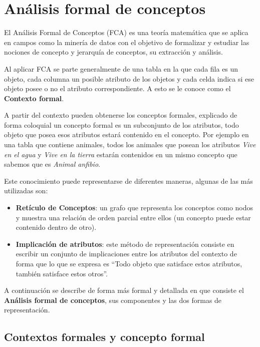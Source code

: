 
\chapter*{Análisis formal de conceptos}

	
	El Análisis Formal de Conceptos (FCA) es una teoría matemática que se aplica en campos como la minería de datos con el objetivo de formalizar y estudiar las nociones de concepto y jerarquía de conceptos, su extracción y análisis.
	
	Al aplicar FCA se parte generalmente de una tabla en la que cada fila es un objeto, cada columna un posible atributo de los objetos y cada celda indica si ese objeto posee o no el atributo correspondiente. A esto se le conoce como el \textbf{Contexto formal}.
	
	A partir del contexto pueden obtenerse los conceptos formales, explicado de forma coloquial un concepto formal es un subconjunto de los atributos, todo objeto que posea esos atributos estará contenido en el concepto. Por ejemplo en una tabla que contiene animales, todos los animales que posean los atributos \textit{Vive en el agua} y \textit{Vive en la tierra} estarán contenidos en un mismo concepto que sabemos que es \textit{Animal anfibio}.
	
	Este conocimiento puede representarse de diferentes maneras, algunas de las más utilizadas son:
	
	\begin{itemize}
		\item  \textbf{Retículo de Conceptos}: un grafo que representa los conceptos como nodos
		y muestra una relación de orden parcial entre ellos (un concepto puede estar contenido dentro de otro).
		
		\item \textbf{Implicación de atributos}: este método de representación consiste en escribir un conjunto de implicaciones entre los atributos del contexto de forma que lo que se expresa es ``Todo objeto que satisface estos atributos, también satisface estos otros''.
	\end{itemize}

	A continuación se describe de forma más formal y detallada en que consiste el \textbf{Análisis formal de conceptos}, sus componentes y las dos formas de representación.
	

\section*{Contextos formales y concepto formal}

